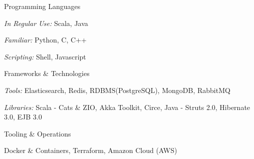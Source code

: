 

\begin{cvskills}

  \cvskill
  {Programming Languages} %
  {
  \begin{cvskillsitems} %
    \item {\emph{In Regular Use:} Scala, Java} %
    \item {\emph{Familiar:} Python, C, C++} %
    \item {\emph{Scripting:} Shell, Javascript} %
  \end{cvskillsitems}
  }

  \cvskill
  {Frameworks \& Technologies} %
  {
  \begin{cvskillsitems} %
    \item {\emph{Tools:} Elasticsearch, Redis, RDBMS(PostgreSQL), MongoDB, RabbitMQ} %
    \item {\emph{Libraries:} Scala - Cats \& ZIO, Akka Toolkit, Circe, Java - Struts 2.0, Hibernate 3.0, EJB 3.0} %
  \end{cvskillsitems}
  }


  \cvskill
  {Tooling \& Operations} %
  {
  \begin{cvskillsitems} %
    \item {Docker \& Containers, Terraform, Amazon Cloud (AWS)} %
  \end{cvskillsitems}
  }

\end{cvskills}
